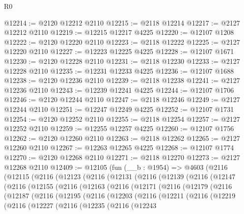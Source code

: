 \begin{lexlean}{R0}
\begin{coremodule}
@12214 := @2120 @12212 @2110
@12215 := @2118 @12214
@12217 := @2127 @12212 @2110
@12219 := @12215 @12217 @4225
@12220 := @12107 @1208
@12222 := @2120 @12220 @2110
@12223 := @2118 @12222
@12225 := @2127 @12220 @2110
@12227 := @12223 @12225 @4225
@12228 := @12107 @1671
@12230 := @2120 @12228 @2110
@12231 := @2118 @12230
@12233 := @2127 @12228 @2110
@12235 := @12231 @12233 @4225
@12236 := @12107 @1688
@12238 := @2120 @12236 @2110
@12239 := @2118 @12238
@12241 := @2127 @12236 @2110
@12243 := @12239 @12241 @4225
@12244 := @12107 @1706
@12246 := @2120 @12244 @2110
@12247 := @2118 @12246
@12249 := @2127 @12244 @2110
@12251 := @12247 @12249 @4225
@12252 := @12107 @1731
@12254 := @2120 @12252 @2110
@12255 := @2118 @12254
@12257 := @2127 @12252 @2110
@12259 := @12255 @12257 @4225
@12260 := @12107 @1756
@12262 := @2120 @12260 @2110
@12263 := @2118 @12262
@12265 := @2127 @12260 @2110
@12267 := @12263 @12265 @4225
@12268 := @12107 @1774
@12270 := @2120 @12268 @2110
@12271 := @2118 @12270
@12273 := @2127 @12268 @2110
@12409 := @12105
    (fun (__b : @1954) =>
    @4603
      (@2116
        (@12115
          (@2116
            (@12123
              (@2116
                (@12131
                  (@2116
                    (@12139
                      (@2116
                        (@12147
                          (@2116
                            (@12155
                              (@2116
                                (@12163
                                  (@2116
                                    (@12171
                                      (@2116
                                        (@12179
                                          (@2116
                                            (@12187
                                              (@2116
                                                (@12195
                                                  (@2116
                                                    (@12203
                                                      (@2116
                                                        (@12211
                                                          (@2116
                                                            (@12219
                                                              (@2116
                                                                (@12227
                                                                  (@2116
                                                                    (@12235
                                                                      (@2116
                                                                        (@12243

\end{coremodule}
\end{lexlean}
